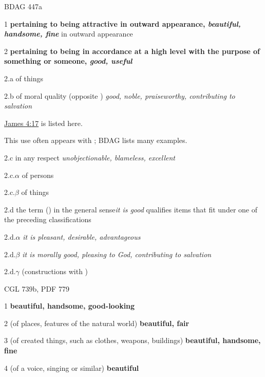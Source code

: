 				\begin{compactdesc}
					\item[BDAG 447a] \textbf{}
						\begin{compactitem}
							\item[1] \textbf{pertaining to being attractive in outward appearance, \textit{beautiful, handsome, fine}} in outward appearance
							\item[2] \textbf{pertaining to being in accordance at a high level with the purpose of something or someone, \textit{good, useful}}
							\item[2.a] of things
							\item[2.b] of moral quality (opposite ) \textit{good, noble, praiseworthy, contributing to salvation}
								\begin{compactitem}
									\item \hyperref[JAMES-4-17]{James 4:17} is listed here.
									\item This use often appears with ; BDAG lists many examples.
								\end{compactitem}
							\item[2.c] in any respect \textit{unobjectionable, blameless, excellent}
							\item[2.c.$\alpha$] of persons
							\item[2.c.$\beta$] of things
							\item[2.d] the term  () in the general sense\textit{it is good} qualifies items that fit under one of the preceding classifications
							\item[2.d.$\alpha$] \textit{it is pleasant, desirable, advantageous}
							\item[2.d.$\beta$] \textit{it is morally good, pleasing to God, contributing to salvation}
							\item[2.d.$\gamma$] (constructions with \gr{μᾶλλον})
						\end{compactitem}
					\item[CGL 739b, PDF 779] \textbf{}
						\begin{compactitem}
							\item[1] \textbf{beautiful, handsome, good-looking}
							\item[2] (of places, features of the natural world) \textbf{beautiful, fair}
							\item[3] (of created things, such as clothes, weapons, buildings) \textbf{beautiful, handsome, fine}
							\item[4] (of a voice, singing or similar) \textbf{beautiful}

\end{compactitem}
\end{compactdesc}
